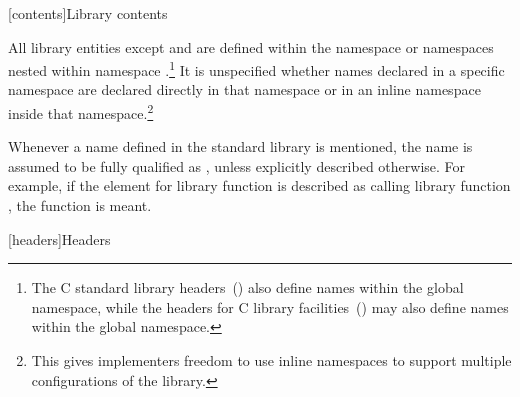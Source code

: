 \setcounter{subsection}{1}
[contents]{Library contents}


\setcounter{Paras}{1}

\pnum
All library entities except
and
are defined within the namespace
 
or namespaces nested within namespace
 .\footnote{The C standard library headers~() also define
names within the global namespace, while the \Cpp{} headers for C library
facilities~() may also define names within the global namespace.}%
It is unspecified whether names declared in a specific namespace are declared
directly in that namespace or in an inline namespace inside that
namespace.\footnote{This gives implementers freedom to use inline namespaces to
support multiple configurations of the library.}

\pnum
Whenever a name  defined in the standard library is mentioned,
the name  is assumed to be fully qualified as
, 
unless explicitly described otherwise. For example, if the \effects element
for library function  is described as calling library function 
,
the function
is meant.

[headers]{Headers}


